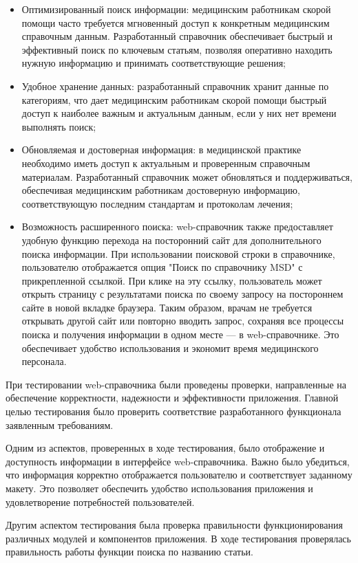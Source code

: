\begin{itemize}
    \item Оптимизированный поиск информации: медицинским работникам скорой помощи часто требуется мгновенный доступ к конкретным медицинским справочным данным. Разработанный справочник обеспечивает быстрый и эффективный поиск по ключевым статьям, позволяя оперативно находить нужную информацию и принимать соответствующие решения;
    \item Удобное хранение данных: разработанный справочник хранит данные по категориям, что дает медицинским работникам скорой помощи быстрый доступ к наиболее важным и актуальным данным, если у них нет времени выполнять поиск;
    \item Обновляемая и достоверная информация: в медицинской практике необходимо иметь доступ к актуальным и проверенным справочным материалам. Разработанный справочник может обновляться и поддерживаться, обеспечивая медицинским работникам достоверную информацию, соответствующую последним стандартам и протоколам лечения;
    \item Возможность расширенного поиска: web-справочник также предоставляет удобную функцию перехода на посторонний сайт для дополнительного поиска информации. При использовании поисковой строки в справочнике, пользователю отображается опция "Поиск по справочнику MSD" с прикрепленной ссылкой. При клике на эту ссылку, пользователь может открыть страницу с результатами поиска по своему запросу на постороннем сайте в новой вкладке браузера. Таким образом, врачам не требуется открывать другой сайт или повторно вводить запрос, сохраняя все процессы поиска и получения информации в одном месте — в web-справочнике. Это обеспечивает удобство использования и экономит время медицинского персонала.
\end{itemize}

При тестировании web-справочника были проведены проверки, направленные на обеспечение корректности, надежности и эффективности приложения. Главной целью тестирования было проверить соответствие разработанного функционала заявленным требованиям.

Одним из аспектов, проверенных в ходе тестирования, было отображение и доступность информации в интерфейсе web-справочника. Важно было убедиться, что информация корректно отображается пользователю и соответствует заданному макету. Это позволяет обеспечить удобство использования приложения и удовлетворение потребностей пользователей.

Другим аспектом тестирования была проверка правильности функционирования различных модулей и компонентов приложения. В ходе тестирования проверялась правильность работы функции поиска по названию статьи. 

